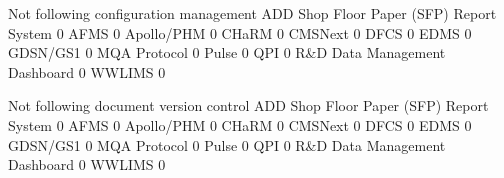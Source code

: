 \documentclass{article}
\begin{document}
\begin{Schunk}
\begin{Soutput}
                                           Not following configuration management
  ADD Shop Floor Paper (SFP) Report System                                      0
  AFMS                                                                          0
  Apollo/PHM                                                                    0
  CHaRM                                                                         0
  CMSNext                                                                       0
  DFCS                                                                          0
  EDMS                                                                          0
  GDSN/GS1                                                                      0
  MQA Protocol                                                                  0
  Pulse                                                                         0
  QPI                                                                           0
  R&D Data Management Dashboard                                                 0
  WWLIMS                                                                        0
                                          
                                           Not following document version control
  ADD Shop Floor Paper (SFP) Report System                                      0
  AFMS                                                                          0
  Apollo/PHM                                                                    0
  CHaRM                                                                         0
  CMSNext                                                                       0
  DFCS                                                                          0
  EDMS                                                                          0
  GDSN/GS1                                                                      0
  MQA Protocol                                                                  0
  Pulse                                                                         0
  QPI                                                                           0
  R&D Data Management Dashboard                                                 0
  WWLIMS                                                                        0
                                          

\end{Soutput}
\end{Schunk}
\end{document}
